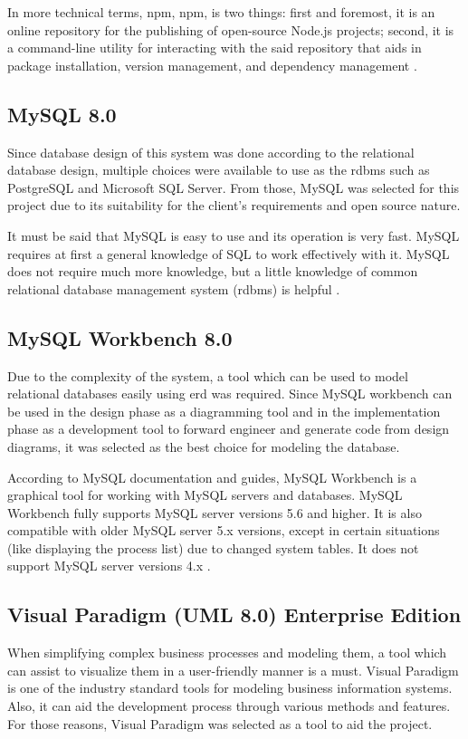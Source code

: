 \documentclass[12pt]{report}
\begin{document}
In more technical terms, \acrshort{npm}, \acrlong{npm}, is two things: first and foremost, it is an online repository for the publishing of open-source Node.js projects; second, it is a command-line utility for interacting with the said repository that aids in package installation, version management, and dependency management \cite{teixeira_2013_nodejs}.

\subsection{MySQL 8.0}
Since database design of this system was done according to the relational database design, multiple choices were available to use as the \acrlong{rdbms} such as PostgreSQL and Microsoft SQL Server. From those, MySQL was selected for this project due to its suitability for the client's requirements and open source nature.

It must be said that MySQL is easy to use and its operation is very fast. MySQL requires at
first a general knowledge of SQL to work effectively with it. MySQL does not require much
more knowledge, but a little knowledge of common relational database management
system (\acrshort{rdbms}) is helpful \cite{vanier_2019_mysql8}.

\subsection{MySQL Workbench 8.0}
Due to the complexity of the system, a tool which can be used to model relational databases easily using \acrshort{erd} was required. Since MySQL workbench can be used in the design phase as a diagramming tool and in the implementation phase as a development tool to forward engineer and generate code from design diagrams, it was selected as the best choice for modeling the database.

According to MySQL documentation and guides, MySQL Workbench is a graphical tool for working with MySQL servers and databases. MySQL Workbench fully supports MySQL server versions 5.6 and higher. It is also compatible with older MySQL server 5.x versions, except in certain situations (like displaying the process list) due to changed system tables. It does not support MySQL server versions 4.x \cite{mclaughlin_2013_mysql}.

\subsection{Visual Paradigm (UML 8.0) Enterprise Edition}
When simplifying complex business processes and modeling them, a tool which can assist to visualize them in a user-friendly manner is a must. Visual Paradigm is one of the industry standard tools for modeling business information systems. Also, it can aid the development process through various methods and features. For those reasons, Visual Paradigm was selected as a tool to aid the project.
\end{document}

